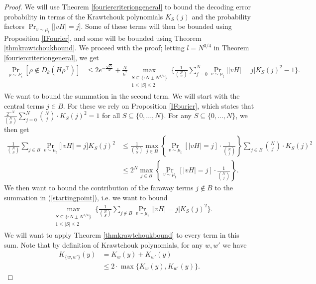 \documentclass[12pt]{article}
\begin{document}
\begin{proof}
We will use Theorem \ref{fouriercriteriongeneral} to bound the decoding error probability in terms of the Krawtchouk polynomials $K_S(j)$ and the probability factors $\Pr_{v\sim\mu_{t}}\big[|v H|=j\big] $. Some of these terms will then be bounded using Proposition \ref{IFourier}, and some will be bounded using Theorem \ref{thmkrawtchoukbound}.
We proceed with the proof; letting $l= N^{3/4}$ in Theorem \ref{fouriercriteriongeneral}, we get
\begin{align}\label{startingpoint}
    \Pr_{\rho\sim P_\epsilon}[\rho\notin D_k(H\rho^\intercal)]&\leq 2e^{-\frac{\sqrt{N}}{3\epsilon}}+\frac{N}{k^*}  \mathop{\max}_{\substack{S\subseteq \{\epsilon N\pm N^{3/4}\} \\
    1\leq|S|\leq 2}} \Big\{  \frac{1}{\binom{N}{S}}\sum_{j=0}^N \Pr_{v\sim\mu_{t}}\big[|v H|=j\big] K_S(j)^2 -1 \Big\}.
\end{align}
We want to bound the summation in the second term. We will start with the central terms $j\in B$. For these we rely on Proposition \ref{IFourier}, which states that $\frac{2^{-N}}{\binom{N}{S}}\sum_{j = 0}^N  \binom{N}{j} \cdot K_S(j)^2=1$ for all $S\subseteq\{0,...,N\}$. For any $S\subseteq\{0,...,N\}$, we then get
\begin{align}\label{center1}
\frac{1}{\binom{N}{S}}\sum_{j\in B} \Pr_{v\sim\mu_{t}}\big[|v H|=j\big] K_S(j)^2&\leq \frac{1}{\binom{N}{S}}\max_{j\in B}\left\{ \Pr_{v\sim \mu_t}[|v H|=j]\cdot \frac{1}{\binom{N}{j}}  \right\}\sum_{j\in B} \binom{N}{j} \cdot K_S(j)^2\nonumber \\
&\leq 2^{N}\max_{j\in B}\left\{ \Pr_{v\sim \mu_t}[|v H|=j] \cdot \frac{1}{\binom{N}{j}}\right\}.
\end{align}
We then want to bound the contribution of the faraway terms $j\notin B$ to the summation in (\ref{startingpoint}), i.e. we want to bound
\begin{align}\label{bdgoal}
    &\mathop{\max}_{\substack{S\subseteq \{\epsilon N\pm N^{3/4}\} \\
    1\leq|S|\leq 2}} \Big\{  \frac{1}{\binom{N}{S}}\sum_{j\notin B} \Pr_{v\sim\mu_{t}}\big[|v H|=j\big] K_S(j)^2  \Big\}.
\end{align}
We will want to apply Theorem \ref{thmkrawtchoukbound} to every term in this sum. Note that by definition of Krawtchouk polynomials, for any $w,w'$ we have
\begin{align*}
    K_{\{w,w'\}}(y)&=K_{w}(y)+K_{w'}(y)\\ &\leq2\cdot\max\big\{K_{w}(y),K_{w'}(y)\big\}.

\end{align*}
\end{proof}
\end{document}
